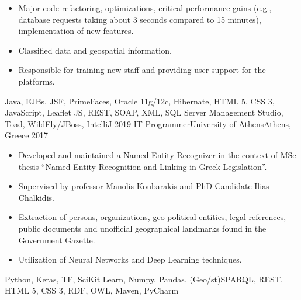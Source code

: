 \begin{experiences}
{\begin{itemize}
                      \item Major code refactoring, optimizations, critical performance gains (e.g., database requests taking about 3 seconds compared to 15 minutes), 
                      implementation of new features.

                      \item Classified data and geospatial information.

                      \item Responsible for training new staff and providing user support for the platforms.
                    \end{itemize}
                    }
                    {Java, EJBs, JSF, PrimeFaces, Oracle 11g/12c, Hibernate, HTML 5, CSS 3, JavaScript, Leaflet JS, REST, SOAP, XML, SQL Server Management Studio, Toad, WildFly/JBoss, IntelliJ}
  \emptySeparator
  \experience
    {2019} {IT Programmer}{University of Athens}{Athens, Greece}
    {2017}    {
                    \begin{itemize}
                      \item Developed and maintained a Named Entity Recognizer in the context of MSc thesis ``Named Entity Recognition and Linking in Greek Legislation''.

                      \item Supervised by professor Manolis Koubarakis and PhD Candidate Ilias Chalkidis.

                      \item Extraction of persons, organizations, geo-political entities, legal references, public documents and unofficial geographical landmarks found in the Government Gazette.

                      \item Utilization of Neural Networks and Deep Learning techniques.
                    \end{itemize}
                    }
                    {Python, Keras, TF, SciKit Learn, Numpy, Pandas, (Geo/st)SPARQL, REST, HTML 5, CSS 3, RDF, OWL, Maven, PyCharm}
\end{experiences}
